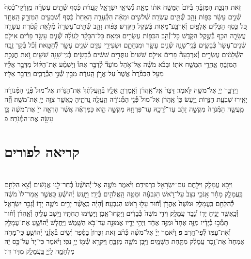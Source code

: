 \documentclass[twoside, openany, parskip=half, 11pt]{book}
\begin{document}
\begin{footnotesize}
\begin{multicols}{2}
זֹ֣את חֲנֻכַּ֣ת הַמִּזְבֵּ֗חַ בְּ֯יוֹם֙ הִמָּשַׁ֣ח אֹת֔וֹ מֵאֵ֖ת נְ֯שִׂיאֵ֣י יִשְׂרָאֵ֑ל קַֽעֲרֹ֨ת כֶּ֜סֶף שְׁ֯תֵּ֣ים עֶשְׂרֵ֗ה מִֽזְרְ֯קֵי־כֶ֨סֶף֙ שְׁ֯נֵ֣ים עָשָׂ֔ר כַּפּ֥וֹת זָהָ֖ב שְׁ֯תֵּ֥ים עֶשְׂרֵֽה׃ שְׁ֯לֹשִׁ֣ים וּמֵאָ֗ה הַקְּ֯עָרָ֤ה הָֽאַחַת֙ כֶּ֔סֶף וְ֯שִׁבְעִ֖ים הַמִּזְרָ֣ק הָֽאֶחָ֑ד כֹּ֚ל כֶּ֣סֶף הַכֵּלִ֔ים אַלְפַּ֥יִם וְ֯אַרְבַּֽע־מֵא֖וֹת בְּ֯שֶׁ֥קֶל הַקֹּֽדֶשׁ׃ כַּפּ֨וֹת זָהָ֤ב שְׁ֯תֵּים־עֶשְׂרֵה֙ מְ֯לֵאֹ֣ת קְ֯טֹ֔רֶת עֲשָׂרָ֧ה עֲשָׂרָ֛ה הַכַּ֖ף בְּ֯שֶׁ֣קֶל הַקֹּ֑דֶשׁ כׇּל־זְ֯הַ֥ב הַכַּפּ֖וֹת עֶשְׂרִ֥ים וּמֵאָֽה׃ כׇּל־הַבָּקָ֨ר לָֽעֹלָ֜ה שְׁ֯נֵ֧ים עָשָׂ֣ר פָּרִ֗ים אֵילִ֤ם שְׁ֯נֵים־עָשָׂר֙ כְּ֯בָשִׂ֧ים בְּ֯נֵֽי־שָׁנָ֛ה שְׁ֯נֵ֥ים עָשָׂ֖ר וּמִנְחָתָ֑ם וּשְׂעִירֵ֥י עִזִּ֛ים שְׁ֯נֵ֥ים עָשָׂ֖ר לְ֯חַטָּֽאת׃ וְ֯כֹ֞ל בְּ֯קַ֣ר זֶ֣בַֽח הַשְּׁ֯לָמִ֗ים עֶשְׂרִ֣ים וְ֯אַרְבָּעָה֘ פָּרִים֒ אֵילִ֤ם שִׁשִּׁים֙ עַתֻּדִ֣ים שִׁשִּׁ֔ים כְּ֯בָשִׂ֥ים בְּ֯נֵֽי־שָׁנָ֖ה שִׁשִּׁ֑ים זֹ֚את חֲנֻכַּ֣ת הַמִּזְבֵּ֔חַ אַֽחֲרֵ֖י הִמָּשַׁ֥ח אֹתֽוֹ׃ וּבְבֹ֨א מֹשֶׁ֜ה אֶל־אֹ֣הֶל מוֹעֵד֘ לְ֯דַבֵּ֣ר אִתּוֹ֒ וַיִּשְׁמַ֨ע אֶת־הַקּ֜וֹל מִדַּבֵּ֣ר אֵלָ֗יו מֵעַ֤ל הַכַּפֹּ֨רֶת֙ אֲשֶׁר֙ עַל־אֲרֹ֣ן הָֽעֵדֻ֔ת מִבֵּ֖ין שְׁ֯נֵ֣י הַכְּ֯רֻבִ֑ים וַיְדַבֵּ֖ר אֵלָֽיו׃

וַיְדַבֵּ֥ר יְיָ֖ אֶל־מֹשֶׁ֥ה לֵּאמֹֽר׃ דַּבֵּר֙ אֶֽל־אַֽהֲרֹ֔ן וְ֯אָֽמַרְתָּ֖ אֵלָ֑יו בְּ֯הַֽעֲלֹֽתְ֯ךָ֙ אֶת־הַנֵּרֹ֔ת אֶל־מוּל֙ פְּ֯נֵ֣י הַמְּ֯נוֹרָ֔ה יָאִ֖ירוּ שִׁבְעַ֥ת הַנֵּרֽוֹת׃ וַיַּ֤עַשׂ כֵּן֙ אַֽהֲרֹ֔ן אֶל־מוּל֙ פְּ֯נֵ֣י הַמְּ֯נוֹרָ֔ה הֶֽעֱלָ֖ה נֵֽרֹתֶ֑יהָ כַּֽאֲשֶׁ֛ר צִוָּ֥ה יְיָ֖ אֶת־מֹשֶֽׁה׃ וְ֯זֶ֨ה מַֽעֲשֵׂ֤ה הַמְּ֯נֹרָה֙ מִקְשָׁ֣ה זָהָ֔ב עַד־יְ֯רֵכָ֥הּ עַד־פִּרְחָ֖הּ מִקְשָׁ֣ה הִ֑וא כַּמַּרְאֶ֗ה אֲשֶׁ֨ר הֶרְאָ֤ה יְיָ֙ אֶת־מֹשֶׁ֔ה כֵּ֥ן עָשָׂ֖ה אֶת־הַמְּ֯נֹרָֽה׃ פ

\end{multicols}

\section[פורים]{קריאה לפורים}


\begin{multicols}{2}
\\
וַיָּבֹ֖א עֲמָלֵ֑ק וַיִּלָּ֥חֶם עִם־יִשְׂרָאֵ֖ל בִּרְפִידִֽם׃ וַיֹּ֨אמֶר מֹשֶׁ֤ה אֶל־יְ֯הוֹשֻׁ֨עַ֙ בְּ֯חַר־לָ֣נוּ אֲנָשִׁ֔ים וְ֯צֵ֖א הִלָּחֵ֣ם בַּֽעֲמָלֵ֑ק מָחָ֗ר אָֽנֹכִ֤י נִצָּב֙ עַל־רֹ֣אשׁ הַגִּבְעָ֔ה וּמַטֵּ֥ה הָֽאֱלֹהִ֖ים בְּ֯יָדִֽי׃ וַיַּ֣עַשׂ יְ֯הוֹשֻׁ֗עַ כַּֽאֲשֶׁ֤ר אָֽמַר־לוֹ֙ מֹשֶׁ֔ה לְ֯הִלָּחֵ֖ם בַּֽעֲמָלֵ֑ק וּמֹשֶׁה֙ אַֽהֲרֹ֣ן וְ֯ח֔וּר עָל֖וּ רֹ֥אשׁ הַגִּבְעָֽה׃ 
וְ֯הָיָ֗ה כַּֽאֲשֶׁ֨ר יָרִ֥ים מֹשֶׁ֛ה יָד֖וֹ וְ֯גָבַ֣ר יִשְׂרָאֵ֑ל וְ֯כַֽאֲשֶׁ֥ר יָנִ֛יחַ יָד֖וֹ וְ֯גָבַ֥ר עֲמָלֵֽק׃ וִידֵ֤י מֹשֶׁה֙ כְּ֯בֵדִ֔ים וַיִּקְחוּ־אֶ֛בֶן וַיָּשִׂ֥ימוּ תַחְתָּ֖יו וַיֵּ֣שֶׁב עָלֶ֑יהָ וְ֯אַֽהֲרֹ֨ן וְ֯ח֜וּר תָּֽמְ֯כ֣וּ בְ֯יָדָ֗יו מִזֶּ֤ה אֶחָד֙ וּמִזֶּ֣ה אֶחָ֔ד וַיְהִ֥י יָדָ֛יו אֱמוּנָ֖ה עַד־בֹּ֥א הַשָּֽׁמֶשׁ׃ וַיַּֽחֲל֧שׁ יְ֯הוֹשֻׁ֛עַ אֶת־עֲמָלֵ֥ק וְ֯אֶת־עַמּ֖וֹ לְ֯פִי־חָֽרֶב׃ \textbf{פ}
וַיֹּ֨אמֶר יְיָ֜ אֶל־מֹשֶׁ֗ה כְּ֯תֹ֨ב זֹ֤את זִכָּרוֹן֙ בַּסֵּ֔פֶר וְ֯שִׂ֖ים בְּ֯אָזְ֯נֵ֣י יְ֯הוֹשֻׁ֑עַ כִּֽי־מָחֹ֤ה אֶמְחֶה֙ אֶת־זֵ֣כֶר עֲמָלֵ֔ק מִתַּ֖חַת הַשָּׁמָֽיִם׃ וַיִּ֥בֶן מֹשֶׁ֖ה מִזְבֵּ֑חַ וַיִּקְרָ֥א שְׁ֯מ֖וֹ יְיָ֥ נִסִּֽי׃ וַיֹּ֗אמֶר כִּי־יָד֙ עַל־כֵּ֣ס יָ֔הּ מִלְחָמָ֥ה לַֽיְיָ֖ בַּֽעֲמָלֵ֑ק מִדֹּ֖ר דֹּֽר׃


\end{multicols}
\end{footnotesize}
\end{document}
